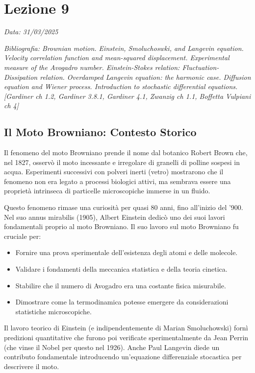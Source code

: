 \chapter{Lezione 9}
\label{chap:lezione_09} %

\begin{flushright}
\textit{Data: 31/03/2025}
\end{flushright}
\textit{Bibliografia: 
Brownian motion. Einstein, Smoluchoswki, and Langevin equation. Velocity correlation function and mean-squared displacement. Experimental measure of the Avogadro number. Einstein-Stokes relation: Fluctuation-Dissipation relation. Overdamped Langevin equation: the harmonic case.  Diffusion equation and Wiener process. Introduction to stochastic differential equations. [Gardiner ch 1.2,  Gardiner 3.8.1, Gardiner 4.1, Zwanzig ch 1.1, Boffetta Vulpiani ch 4]}


\section{Il Moto Browniano: Contesto Storico}
Il fenomeno del moto Browniano prende il nome dal botanico Robert Brown che, nel 1827, osservò il moto incessante e irregolare di granelli di polline sospesi in acqua. Esperimenti successivi con polveri inerti (vetro) mostrarono che il fenomeno non era legato a processi biologici attivi, ma sembrava essere una proprietà intrinseca di particelle microscopiche immerse in un fluido.

Questo fenomeno rimase una curiosità per quasi 80 anni, fino all'inizio del '900. Nel suo annus mirabilis (1905), Albert Einstein dedicò uno dei suoi lavori fondamentali proprio al moto Browniano. Il suo lavoro sul moto Browniano fu cruciale per:

\begin{itemize}
    \item Fornire una prova sperimentale dell'esistenza degli atomi e delle molecole.
    \item Validare i fondamenti della meccanica statistica e della teoria cinetica.
    \item Stabilire che il numero di Avogadro era una costante fisica misurabile.
    \item Dimostrare come la termodinamica potesse emergere da considerazioni statistiche microscopiche.
\end{itemize}

Il lavoro teorico di Einstein (e indipendentemente di Marian Smoluchowski) fornì predizioni quantitative che furono poi verificate sperimentalmente da Jean Perrin (che vinse il Nobel per questo nel 1926). Anche Paul Langevin diede un contributo fondamentale introducendo un'equazione differenziale stocastica per descrivere il moto.

